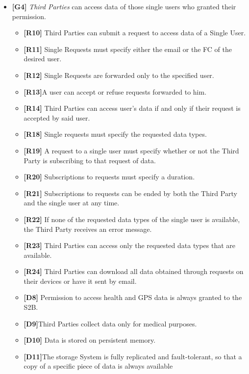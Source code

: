 \documentclass[titlepage]{article}
\begin{document}
\begin{itemize}
\begin{itemize}
					\end{itemize}
   				 \item {\bf [G4]} {\it Third Parties} can access data of those single users who granted their permission.
				 \begin{itemize} %
				 	\item {\bf [R10]} Third Parties can submit a request to access data of a Single User. 
\item {\bf [R11]} Single Requests must specify either the email or the FC of the desired user.
\item {\bf [R12]} Single Requests are forwarded only to the specified user. 
\item {\bf [R13]}A user can accept or refuse requests forwarded to him. 
\item {\bf [R14]} Third Parties can access user’s data if and only if their request is accepted by said user. 
\item {\bf [R18]} Single requests must specify the requested data types. 
\item {\bf [R19]} A request to a single user must specify whether or not the Third Party is subscribing to that request of data.
\item {\bf [R20]} Subscriptions to requests must specify a duration.
\item {\bf [R21]} Subscriptions to requests can be ended by both the Third Party and the single user at any time.
\item {\bf [R22]} If none of the requested data types of the single user is available, the Third Party receives an error message.
\item {\bf [R23]} Third Parties can access only the requested data types that are available.
\item {\bf [R24]} Third Parties can download all data obtained through requests on their devices or have it sent by email.
\item {\bf [D8]} Permission to access health and GPS data is always granted to the S2B.
\item {\bf [D9]}Third Parties collect data only for medical purposes.
\item {\bf [D10]} Data is stored on persistent memory. 
\item {\bf [D11]}The storage System is fully replicated and fault-tolerant, so that a copy of a specific piece of data is always available
					 
					\end{itemize}


\end{itemize}
\end{document}
